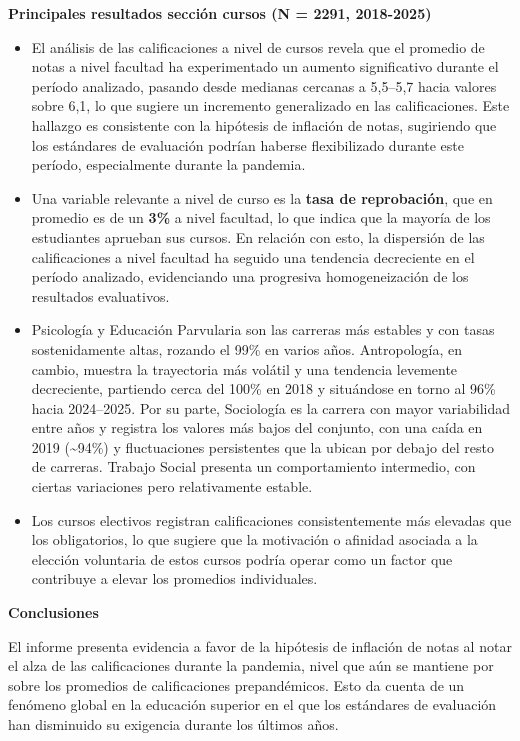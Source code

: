 \documentclass[
  spanish,
  a4paper,
  oneside]{scrbook}
\begin{document}
\textbf{Principales resultados sección cursos (N = 2291, 2018-2025)}

\begin{itemize}
\item
  El análisis de las calificaciones a nivel de cursos revela que el
  promedio de notas a nivel facultad ha experimentado un aumento
  significativo durante el período analizado, pasando desde medianas
  cercanas a 5,5--5,7 hacia valores sobre 6,1, lo que sugiere un
  incremento generalizado en las calificaciones. Este hallazgo es
  consistente con la hipótesis de inflación de notas, sugiriendo que los
  estándares de evaluación podrían haberse flexibilizado durante este
  período, especialmente durante la pandemia.
\item
  Una variable relevante a nivel de curso es la \textbf{tasa de
  reprobación}, que en promedio es de un \textbf{3\%} a nivel facultad,
  lo que indica que la mayoría de los estudiantes aprueban sus cursos.
  En relación con esto, la dispersión de las calificaciones a nivel
  facultad ha seguido una tendencia decreciente en el período analizado,
  evidenciando una progresiva homogeneización de los resultados
  evaluativos.
\item
  Psicología y Educación Parvularia son las carreras más estables y con
  tasas sostenidamente altas, rozando el 99\% en varios años.
  Antropología, en cambio, muestra la trayectoria más volátil y una
  tendencia levemente decreciente, partiendo cerca del 100\% en 2018 y
  situándose en torno al 96\% hacia 2024--2025. Por su parte, Sociología
  es la carrera con mayor variabilidad entre años y registra los valores
  más bajos del conjunto, con una caída en 2019 (\textasciitilde94\%) y
  fluctuaciones persistentes que la ubican por debajo del resto de
  carreras. Trabajo Social presenta un comportamiento intermedio, con
  ciertas variaciones pero relativamente estable.
\item
  Los cursos electivos registran calificaciones consistentemente más
  elevadas que los obligatorios, lo que sugiere que la motivación o
  afinidad asociada a la elección voluntaria de estos cursos podría
  operar como un factor que contribuye a elevar los promedios
  individuales.
\end{itemize}

\textbf{Conclusiones}

El informe presenta evidencia a favor de la hipótesis de inflación de
notas al notar el alza de las calificaciones durante la pandemia, nivel
que aún se mantiene por sobre los promedios de calificaciones
prepandémicos. Esto da cuenta de un fenómeno global en la educación
superior en el que los estándares de evaluación han disminuido su
exigencia durante los últimos años.
\end{document}

